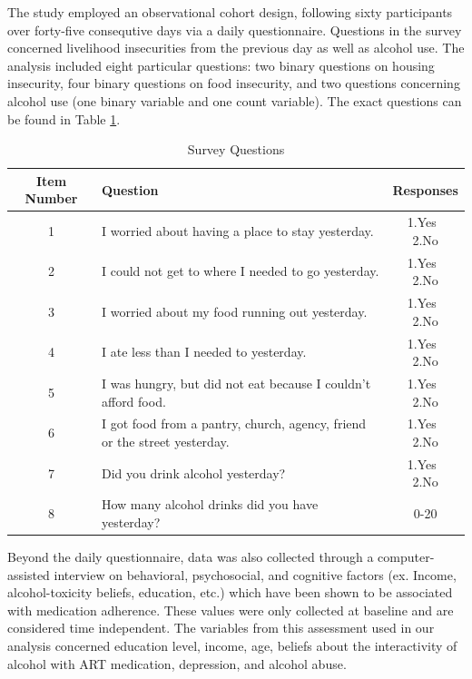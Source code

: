 \documentclass{svjour3}\usepackage[]{graphicx}\usepackage[]{color}
\begin{document}
The study employed an observational cohort design, following sixty participants over forty-five consequtive days via a daily questionnaire. Questions in the survey concerned livelihood insecurities from the previous day as well as alcohol use. The analysis included eight particular questions: two binary questions on housing insecurity, four binary questions on food insecurity, and two questions concerning alcohol use (one binary variable and one count variable). The exact questions can be found in Table \ref{tab:survey_qs}. \par

\begin{table}[H]
	\centering
	\caption{Survey Questions}
	\label{tab:survey_qs}
	\begin{tabular}{cp{6.5cm}c}
		\toprule
		Item Number & Question & Responses\\
		\midrule
		1 & I worried about having a place to stay yesterday. & 1.Yes $\>$ 2.No \\
		2 & I could not get to where I needed to go yesterday. & 1.Yes $\>$ 2.No \\
		3 & I worried about my food running out yesterday. & 1.Yes $\>$ 2.No \\
		4 & I ate less than I needed to yesterday. & 1.Yes $\>$ 2.No \\
		5 & I was hungry, but did not eat because I couldn't afford food. & 1.Yes $\>$ 2.No \\
		6 & I got food from a pantry, church, agency, friend or the street yesterday. & 1.Yes $\>$ 2.No \\
		7 & Did you drink alcohol yesterday? & 1.Yes $\>$ 2.No \\
		8 & How many alcohol drinks did you have yesterday? & 0-20 \\
		\bottomrule
	\end{tabular}
\end{table}

Beyond the daily questionnaire, data was also collected through a computer-assisted interview on behavioral, psychosocial, and cognitive factors (ex. Income, alcohol-toxicity beliefs, education, etc.) which have been shown to be associated with medication adherence. These values were only collected at baseline and are considered time independent. The variables from this assessment used in our analysis concerned education level, income, age, beliefs about the interactivity of alcohol with ART medication, depression, and alcohol abuse. \par
\end{document}
